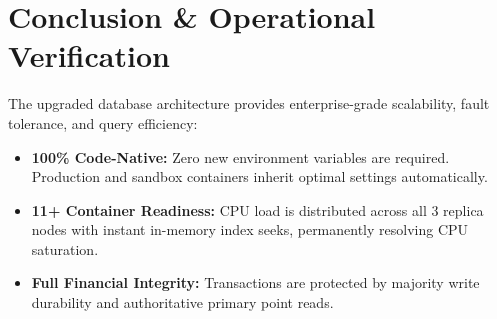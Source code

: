 \documentclass[11pt,a4paper]{article}
\begin{document}
\section{Conclusion \& Operational Verification}

The upgraded database architecture provides enterprise-grade scalability, fault tolerance, and query efficiency:

\begin{itemize}
    \item \textbf{100\% Code-Native:} Zero new environment variables are required. Production and sandbox containers inherit optimal settings automatically.
    \item \textbf{11+ Container Readiness:} CPU load is distributed across all 3 replica nodes with instant in-memory index seeks, permanently resolving CPU saturation.
    \item \textbf{Full Financial Integrity:} Transactions are protected by majority write durability and authoritative primary point reads.
\end{itemize}
\end{document}
